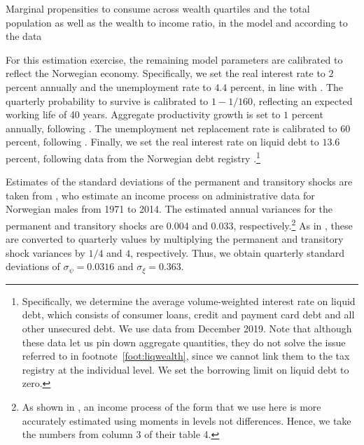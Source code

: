 \documentclass[\econtexRoot/HAFiscal]{subfiles}
\begin{document}

\begin{table}[t]
  \center
  
  \caption{Marginal propensities to consume across wealth quartiles and the total population as well as the wealth to income ratio, in the model and according to the data}
  \notinsubfile{\label{tab:MPC_WQ}}
\end{table}


For this estimation exercise, the remaining model parameters are calibrated to reflect the Norwegian economy. Specifically, we set the real interest rate to $2$ percent annually and the unemployment rate to $4.4$ percent, in line with \citet{aursland_state-dependent_2020}. The quarterly probability to survive is calibrated to $1-1/160$, reflecting an expected working life of 40 years. Aggregate productivity growth is set to $1$ percent annually, following \citet{kravik_navigating_2019}. The unemployment net replacement rate is calibrated to $60$ percent, following \citet{oecd_net_2020}. Finally, we set the real interest rate on liquid debt to $13.6$ percent, following data from the Norwegian debt registry \citet{gjeldsregistret_nokkeltall_2022}.\footnote{Specifically, we determine the average volume-weighted interest rate on liquid debt, which consists of consumer loans, credit and payment card debt and all other unsecured debt. We use data from December 2019. Note that although these data let us pin down aggregate quantities, they do not solve the issue referred to in footnote~\ref{foot:liqwealth}, since we cannot link them to the tax registry at the individual level. We set the borrowing limit on liquid debt to zero.}

Estimates of the standard deviations of the permanent and transitory shocks are taken from \citet{crawley2022parsimonious}, who estimate an income process on administrative data for Norwegian males from 1971 to 2014. The estimated annual variances for the permanent and transitory shocks are 0.004 and 0.033, respectively.\footnote{As shown in \citet{crawley2022parsimonious}, an income process of the form that we use here is more accurately estimated using moments in levels not differences. Hence, we take the numbers from column 3 of their table 4.} As in \citet{carroll2020sticky}, these are converted to quarterly values by multiplying the permanent and transitory shock variances by $1/4$ and $4$, respectively. Thus, we obtain quarterly standard deviations of $\sigma_\psi=0.0316$ and $\sigma_\xi=0.363$.
\end{document}
